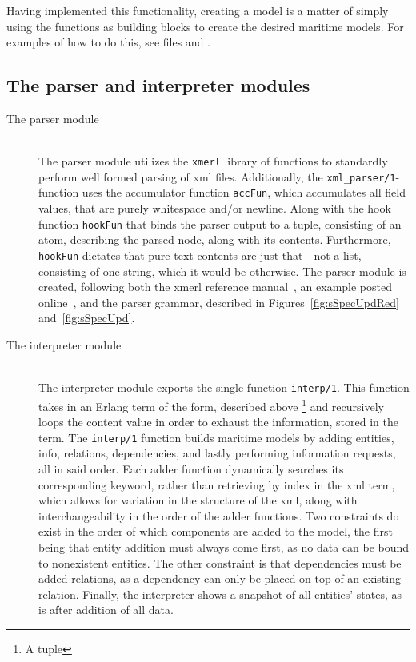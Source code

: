 Having implemented this functionality, creating a model is a matter of simply using the functions as building blocks to create the desired maritime models. For examples of how to do this, see files  and .

\subsection{The parser and interpreter modules}

\begin{description}
	\item[The parser module]\ \\
		The parser module utilizes the \lstinline{xmerl} library of functions to standardly perform well formed parsing of xml files. Additionally, the \lstinline{xml_parser/1}-function uses the accumulator function \lstinline{accFun}, which accumulates all field values, that are  purely whitespace and/or newline. Along with the hook function \lstinline{hookFun} that binds the parser output to a tuple, consisting of an atom, describing the parsed node, along with its contents. Furthermore, \lstinline{hookFun} dictates that pure text contents are just that - not a list, consisting of one string, which it would be otherwise. The parser module is created, following both the xmerl reference manual~\cite{xmerl}, an example posted online~\cite{xmerlEx}, and the parser grammar, described in Figures~\ref{fig:sSpecUpdRed} and~\ref{fig:sSpecUpd}.
	\item[The interpreter module]\ \\
		The interpreter module exports the single function \lstinline{interp/1}. This function takes in an Erlang term of the form, described above \footnote{A tuple} and recursively loops the content value in order to exhaust the information, stored in the term. The \lstinline{interp/1} function builds maritime models by adding entities, info, relations, dependencies, and lastly performing information requests, all in said order. Each adder function dynamically searches its corresponding keyword, rather than retrieving by index in the xml term, which allows for variation in the structure of the xml, along with interchangeability in the order of the adder functions. Two constraints do exist in the order of which components are added to the model, the first being that entity addition must always come first, as no data can be bound to nonexistent entities. The other constraint is that dependencies must be added  relations, as a dependency can only be placed on top of an existing relation. Finally, the interpreter shows a snapshot of all entities' states, as is after addition of all data.
\end{description}
